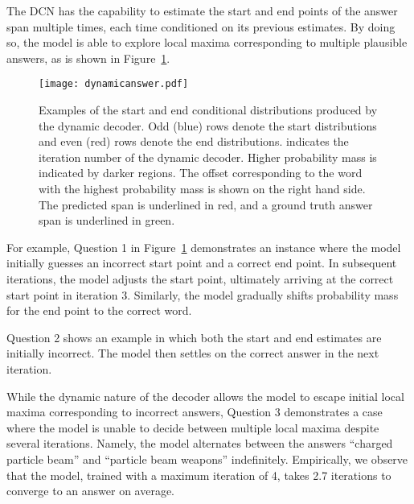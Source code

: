 \documentclass{article} \usepackage{iclr2017_conference,times}
\newcommand{\ours}{DCN\xspace}
\begin{document}
The \ours has the capability to estimate the start and end points of the answer span multiple times, each time conditioned on its previous estimates.
By doing so, the model is able to explore local maxima corresponding to multiple plausible answers, as is shown in Figure~\ref{fig:iterations}.

\begin{figure}[!th]
\centering
\texttt{[image: dynamicanswer.pdf]}
\vspace{-1cm}
\caption{Examples of the start and end conditional distributions produced by the dynamic decoder. Odd (blue) rows denote the start distributions and even (red) rows denote the end distributions.  indicates the iteration number of the dynamic decoder. Higher probability mass is indicated by darker regions. The offset corresponding to the word with the highest probability mass is shown on the right hand side. The predicted span is underlined in red, and a ground truth answer span is underlined in green.}
\label{fig:iterations}
\end{figure}

For example, Question 1 in Figure~\ref{fig:iterations} demonstrates an instance where the model initially guesses an incorrect start point and a correct end point.
In subsequent iterations, the model adjusts the start point, ultimately arriving at the correct start point in iteration 3.
Similarly, the model gradually shifts probability mass for the end point to the correct word.

Question 2 shows an example in which both the start and end estimates are initially incorrect.
The model then settles on the correct answer in the next iteration.

While the dynamic nature of the decoder allows the model to escape initial local maxima corresponding to incorrect answers, Question 3 demonstrates a case where the model is unable to decide between multiple local maxima despite several iterations.
Namely, the model alternates between the answers ``charged particle beam'' and ``particle beam weapons'' indefinitely.
Empirically, we observe that the model, trained with a maximum iteration of 4, takes 2.7 iterations to converge to an answer on average.
\end{document}
